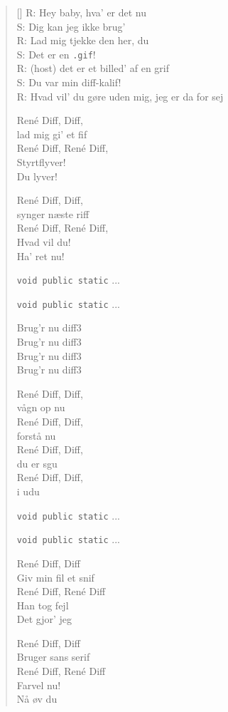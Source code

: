 \begin{multicols}
\begin{verse}[\versewidth]
R: Hey baby, hva' er det nu\\
S: Dig kan jeg ikke brug'\\
R: Lad mig tjekke den her, du\\
S: Det er en \texttt{.gif}!\\
R: (host) det er et billed' af en grif\\
S: Du var min diff-kalif!\\
R: Hvad vil' du gøre uden mig, jeg er da for sej

René Diff, Diff,\\
lad mig gi' et fif\\
René Diff, René Diff,\\
Styrtflyver!\\
Du lyver!

René Diff, Diff,\\
synger næste riff\\
René Diff, René Diff,\\
Hvad vil du!\\
Ha' ret nu!

\texttt{void public static} ...

\texttt{void public static} ...

Brug'r nu diff3\\
Brug'r nu diff3\\
Brug'r nu diff3\\
Brug'r nu diff3

René Diff, Diff,\\
vågn op nu\\
René Diff, Diff,\\
forstå nu\\
René Diff, Diff,\\
du er sgu\\
René Diff, Diff,\\
i udu

\texttt{void public static} ...

\texttt{void public static} ...

René Diff, Diff\\
Giv min fil et snif\\
René Diff, René Diff\\
Han tog fejl\\
Det gjor' jeg

René Diff, Diff\\
Bruger sans serif\\
René Diff, René Diff\\
Farvel nu!\\
Nå øv du
\end{verse}
\end{multicols}
\newpage

